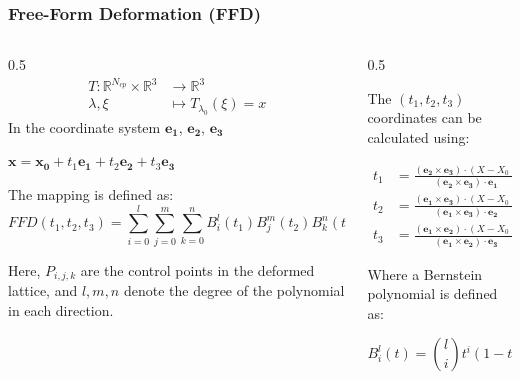 \documentclass[aspectratio=169]{beamer}
\begin{document}
\begin{frame}
  \frametitle{Free-Form Deformation (FFD)}
  \begin{columns}
    \begin{column}{0.5\textwidth}
      \begin{align*}
        T: \mathbb{R}^{N_{cp}} \times \mathbb{R}^3 &\longrightarrow
        \mathbb{R}^3 \\
        \lambda, \xi &\longmapsto T_{\lambda_0}(\xi) = x
      \end{align*}
      In the coordinate system $\mathbf{e_1}$, $\mathbf{e_2}$, $\mathbf{e_3}$

      $\mathbf{x} = \mathbf{x_0} + t_1 \mathbf{e_1} + t_2
      \mathbf{e_2} + t_3 \mathbf{e_3}$

      The mapping is defined as:
      \begin{equation}
        FFD(t_1,t_2,t_3) = \sum_{i=0}^{l} \sum_{j=0}^{m} \sum_{k=0}^{n}
        B_{i}^{l}(t_1) B_{j}^{m}(t_2) B_{k}^{n}(t_3) P_{i,j,k}
      \end{equation}

      Here, $P_{i,j,k}$ are the control points in the deformed lattice,
      and $l, m, n$ denote the degree of the polynomial in each direction.

    \end{column}

    \begin{column}{0.5\textwidth}
      {\small
        The $(t_1, t_2, t_3)$ coordinates can be calculated using:

        \begin{align}
          t_1 &= \frac{(\mathbf{e_2} \times \mathbf{e_3}) \cdot (X -
          X_0)}{(\mathbf{e_2} \times \mathbf{e_3}) \cdot \mathbf{e_1}} \\
          t_2 &= \frac{(\mathbf{e_1} \times \mathbf{e_3}) \cdot (X -
          X_0)}{(\mathbf{e_1} \times \mathbf{e_3}) \cdot \mathbf{e_2}} \\
          t_3 &= \frac{(\mathbf{e_1} \times \mathbf{e_2}) \cdot (X -
          X_0)}{(\mathbf{e_1} \times \mathbf{e_2}) \cdot \mathbf{e_3}}
        \end{align}

        Where a Bernstein polynomial is defined as:

        \begin{equation}
          B_{i}^{l}(t) = \binom{l}{i}t^{i}(1-t)^{l-i}
        \end{equation}
      }
    \end{column}
  \end{columns}
\end{frame}
\end{document}
